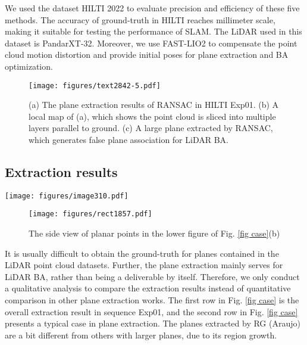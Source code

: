 \documentclass[letterpaper, 10 pt, conference]{ieeeconf}  %
\begin{document}
We used the dataset HILTI 2022 \cite{zhang2022hilti} to evaluate precision and efficiency of these five methods. The accuracy of ground-truth in HILTI reaches millimeter scale, making it suitable for testing the performance of SLAM. The LiDAR used in this dataset is PandarXT-32. Moreover, we use FAST-LIO2 \cite{xu2022fast} to compensate the point cloud motion distortion and provide initial poses for plane extraction and BA optimization. 

\begin{figure} [t]
	\centering
	\texttt{[image: figures/text2842-5.pdf]}
	\caption{{(a) The plane extraction results of RANSAC in HILTI Exp01. (b) A local map of (a), which shows the point cloud is sliced into multiple layers parallel to ground. (c) A large plane extracted by RANSAC, which generates false plane association for LiDAR BA.}}
	\label{fig segment ransac}
\end{figure}

\subsection{Extraction results} \label{experiment1}

\begin{figure*} [t]
	\centering
	\texttt{[image: figures/image310.pdf]}
	\caption{The plane extraction results of different methods in Exp01 of the HILTI 2022 dataset. The figure in first row is the overall extraction result. The figure in second row is a typical case of the extraction.}
	\label{fig case}
\end{figure*}

\begin{figure} [t]
	\centering
	\texttt{[image: figures/rect1857.pdf]}
	\caption{The side view of planar points in the lower figure of Fig. \ref{fig case}(b) }
	\label{fig ransac}
\end{figure}

It is usually difficult to obtain the ground-truth for planes contained in the LiDAR point cloud datasets. Further, the plane extraction mainly serves for LiDAR BA, rather than being a deliverable by itself. Therefore, we only conduct a qualitative analysis to compare the extraction results instead of quantitative comparison in other plane extraction works. The first row in Fig. \ref{fig case} is the overall extraction result in sequence Exp01, and the second row in Fig. \ref{fig case} presents a typical case in plane extraction. {The planes extracted by RG (Araujo) are a bit different from others with larger planes, due to its region growth.}
\end{document}
